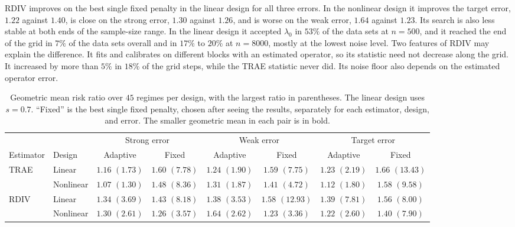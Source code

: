 \documentclass[12pt]{article}
\theoremstyle{plain}
\theoremstyle{definition}
\theoremstyle{remark}
\begin{document}
RDIV improves on the best single fixed penalty in the linear design for all three errors. In the nonlinear design it improves the target error, $1.22$ against $1.40$, is close on the strong error, $1.30$ against $1.26$, and is worse on the weak error, $1.64$ against $1.23$. Its search is also less stable at both ends of the sample-size range. In the linear design it accepted $\lambda_0$ in $53\%$ of the data sets at $n=500$, and it reached the end of the grid in $7\%$ of the data sets overall and in $17\%$ to $20\%$ at $n=8000$, mostly at the lowest noise level. Two features of RDIV may explain the difference. It fits and calibrates on different blocks with an estimated operator, so its statistic need not decrease along the grid. It increased by more than $5\%$ in $18\%$ of the grid steps, while the TRAE statistic never did. Its noise floor also depends on the estimated operator error.

\begin{table}[!htp]
\centering
\caption{Geometric mean risk ratio over $45$ regimes per design, with the largest ratio in parentheses. The linear design uses $s=0.7$. ``Fixed'' is the best single fixed penalty, chosen after seeing the results, separately for each estimator, design, and error. The smaller geometric mean in each pair is in bold.}
\label{tab:kernel_designs}
\small
\setlength{\tabcolsep}{2.5pt}
\begin{tabular}{llcccccc}
\toprule
 & & \multicolumn{2}{c}{Strong error} & \multicolumn{2}{c}{Weak error} & \multicolumn{2}{c}{Target error}\\
\cmidrule(lr){3-4}\cmidrule(lr){5-6}\cmidrule(lr){7-8}
Estimator & Design & Adaptive & Fixed & Adaptive & Fixed & Adaptive & Fixed\\
\midrule
TRAE & Linear & $\mathbf{1.16}$ $(1.73)$ & $1.60$ $(7.78)$ & $\mathbf{1.24}$ $(1.90)$ & $1.59$ $(7.75)$ & $\mathbf{1.23}$ $(2.19)$ & $1.66$ $(13.43)$\\
 & Nonlinear & $\mathbf{1.07}$ $(1.30)$ & $1.48$ $(8.36)$ & $\mathbf{1.31}$ $(1.87)$ & $1.41$ $(4.72)$ & $\mathbf{1.12}$ $(1.80)$ & $1.58$ $(9.58)$\\
RDIV & Linear & $\mathbf{1.34}$ $(3.69)$ & $1.43$ $(8.18)$ & $\mathbf{1.38}$ $(3.53)$ & $1.58$ $(12.93)$ & $\mathbf{1.39}$ $(7.81)$ & $1.56$ $(8.00)$\\
 & Nonlinear & $1.30$ $(2.61)$ & $\mathbf{1.26}$ $(3.57)$ & $1.64$ $(2.62)$ & $\mathbf{1.23}$ $(3.36)$ & $\mathbf{1.22}$ $(2.60)$ & $1.40$ $(7.90)$\\
\bottomrule
\end{tabular}
\end{table}
\end{document}
